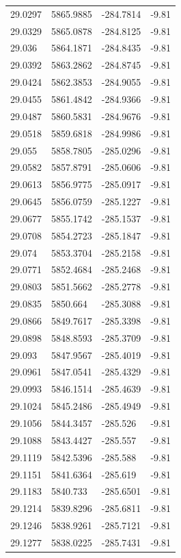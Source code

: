 \begin{table}[H]
\begin{tabular}{llll}
29.0297 & 5865.9885 & -284.7814 & -9.81 \\
29.0329 & 5865.0878 & -284.8125 & -9.81 \\
29.036 & 5864.1871 & -284.8435 & -9.81 \\
29.0392 & 5863.2862 & -284.8745 & -9.81 \\
29.0424 & 5862.3853 & -284.9055 & -9.81 \\
29.0455 & 5861.4842 & -284.9366 & -9.81 \\
29.0487 & 5860.5831 & -284.9676 & -9.81 \\
29.0518 & 5859.6818 & -284.9986 & -9.81 \\
29.055 & 5858.7805 & -285.0296 & -9.81 \\
29.0582 & 5857.8791 & -285.0606 & -9.81 \\
29.0613 & 5856.9775 & -285.0917 & -9.81 \\
29.0645 & 5856.0759 & -285.1227 & -9.81 \\
29.0677 & 5855.1742 & -285.1537 & -9.81 \\
29.0708 & 5854.2723 & -285.1847 & -9.81 \\
29.074 & 5853.3704 & -285.2158 & -9.81 \\
29.0771 & 5852.4684 & -285.2468 & -9.81 \\
29.0803 & 5851.5662 & -285.2778 & -9.81 \\
29.0835 & 5850.664 & -285.3088 & -9.81 \\
29.0866 & 5849.7617 & -285.3398 & -9.81 \\
29.0898 & 5848.8593 & -285.3709 & -9.81 \\
29.093 & 5847.9567 & -285.4019 & -9.81 \\
29.0961 & 5847.0541 & -285.4329 & -9.81 \\
29.0993 & 5846.1514 & -285.4639 & -9.81 \\
29.1024 & 5845.2486 & -285.4949 & -9.81 \\
29.1056 & 5844.3457 & -285.526 & -9.81 \\
29.1088 & 5843.4427 & -285.557 & -9.81 \\
29.1119 & 5842.5396 & -285.588 & -9.81 \\
29.1151 & 5841.6364 & -285.619 & -9.81 \\
29.1183 & 5840.733 & -285.6501 & -9.81 \\
29.1214 & 5839.8296 & -285.6811 & -9.81 \\
29.1246 & 5838.9261 & -285.7121 & -9.81 \\
29.1277 & 5838.0225 & -285.7431 & -9.81 \\

\end{tabular}
\end{table}
